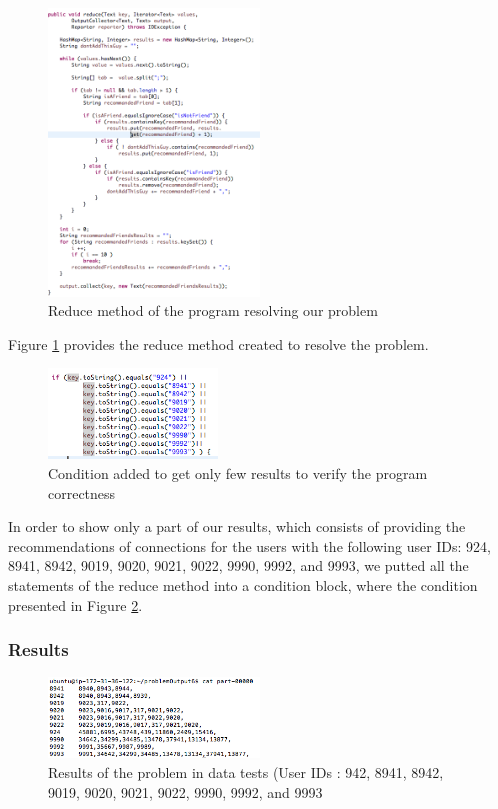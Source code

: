 \documentclass[10pt, conference]{IEEEtran}
\begin{document}
\begin{figure}
	\includegraphics[width=0.5\textwidth]{plots/reduce.png}
	\caption{\label{reduceProgram} Reduce method of the program resolving our problem}
\end{figure}


Figure \ref{reduceProgram} provides the reduce method created to resolve the problem.

\begin{figure}
	\includegraphics[width=0.4\textwidth]{plots/condition.png}
	\caption{\label{conditionProgram} Condition added to get only few results to verify the program correctness}
\end{figure}


In order to show only a part of our results, which consists of providing the recommendations of connections for the users with the following user IDs: 924, 8941, 8942, 9019, 9020, 9021, 9022, 9990, 9992, and 9993, we putted all the statements of the reduce method into a condition block, where the condition presented in Figure \ref{conditionProgram}.

\subsubsection{Results}

\begin{figure}
	\includegraphics[width=0.5\textwidth]{plots/resultProblem.png}
	\caption{\label{resultProblem} Results of the problem in data tests (User IDs : 942, 8941, 8942, 9019, 9020, 9021, 9022, 9990, 9992, and 9993 }
\end{figure}
\end{document}
